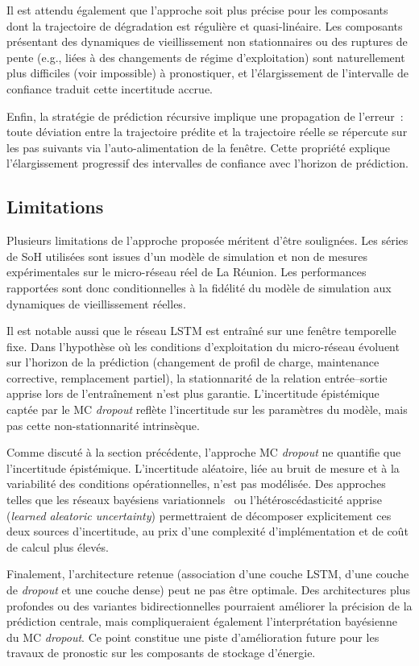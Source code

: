 Il est attendu également que l'approche soit plus précise pour les composants dont la trajectoire de dégradation est régulière et quasi-linéaire. Les composants présentant des dynamiques de vieillissement non stationnaires ou des ruptures de pente (e.g., liées à des changements de régime d'exploitation) sont naturellement plus difficiles (voir impossible) à pronostiquer, et l'élargissement de l'intervalle de confiance traduit cette incertitude accrue.
 
Enfin, la stratégie de prédiction récursive implique une propagation de
l'erreur~: toute déviation entre la trajectoire prédite et la trajectoire réelle se répercute sur les pas suivants via l'auto-alimentation de la fenêtre. Cette propriété explique l'élargissement progressif des intervalles de confiance avec
l'horizon de prédiction. 

\subsection{Limitations}
Plusieurs limitations de l'approche proposée méritent d'être soulignées. Les séries de SoH utilisées sont issues d'un modèle de simulation et non de mesures expérimentales sur le micro-réseau réel de La Réunion. Les performances rapportées sont donc conditionnelles à la fidélité du modèle de simulation aux dynamiques de vieillissement réelles. 
 
Il est notable aussi que le réseau LSTM est entraîné sur une fenêtre temporelle fixe. Dans l'hypothèse où les conditions d'exploitation du micro-réseau évoluent sur l'horizon de la prédiction (changement de profil de charge, maintenance corrective, remplacement partiel), la stationnarité de la relation entrée--sortie apprise lors de l'entraînement n'est plus garantie. L'incertitude épistémique captée par le MC \textit{dropout} reflète l'incertitude sur les paramètres du modèle, mais pas cette non-stationnarité intrinsèque.
 
Comme discuté à la section précédente, l'approche MC \textit{dropout} ne quantifie que l'incertitude épistémique. L'incertitude aléatoire, liée au bruit de mesure et à la variabilité des conditions opérationnelles, n'est pas modélisée. Des approches telles que les réseaux bayésiens variationnels~\cite{kendall_what_2017} ou l'hétéroscédasticité apprise (\textit{learned aleatoric uncertainty}) permettraient de décomposer explicitement ces deux sources d'incertitude, au prix d'une complexité d'implémentation et de coût de calcul plus élevés.
 
Finalement, l'architecture retenue (association d'une couche LSTM, d'une couche de \textit{dropout} et une couche dense) peut ne pas être optimale. Des architectures plus profondes ou des variantes bidirectionnelles pourraient améliorer la précision de la prédiction centrale, mais compliqueraient également l'interprétation bayésienne du MC \textit{dropout}. Ce point constitue une piste d'amélioration future pour les travaux de pronostic sur les composants de stockage d'énergie.

\newpage